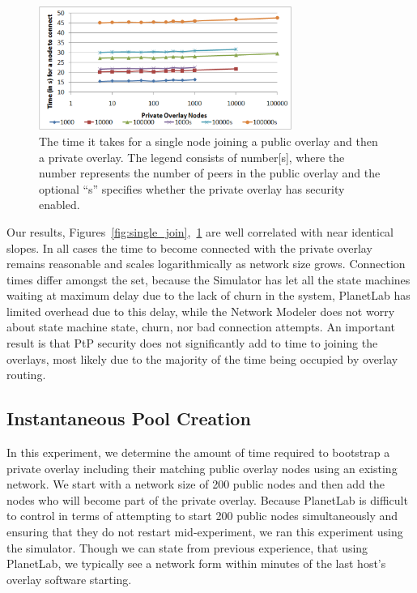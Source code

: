 \documentclass[conference]{IEEEtran}
\begin{document}
\begin{figure}[h]
\centering
\includegraphics[width=3.25in]{single_join_mod.eps}
\caption{The time it takes for a single node joining a public overlay and then
a private overlay. The legend consists of number[s], where the number
represents the number of peers in the public overlay and the optional ``s''
specifies whether the private overlay has security enabled.}
\label{fig:single_join_mod}
\end{figure}

Our results, Figures~\ref{fig:single_join},~\ref{fig:single_join_mod} are well
correlated with near identical slopes.  In all cases the time to become
connected with the private overlay remains reasonable and scales logarithmically
as network size grows.  Connection times differ amongst the set, because
the Simulator has let all the state machines waiting at maximum delay due to
the lack of churn in the system, PlanetLab has limited overhead due to this
delay, while the Network Modeler does not worry about state machine state,
churn, nor bad connection attempts.  An important result is that PtP security
does not significantly add to time to joining the overlays, most likely due
to the majority of the time being occupied by overlay routing.

\subsection{Instantaneous Pool Creation}
\label{mass_join}
In this experiment, we determine the amount of time required to bootstrap a
private overlay including their matching public overlay nodes using an existing
network.  We start with a network size of 200 public nodes and then add the
nodes who will become part of the private overlay.  Because PlanetLab is
difficult to control in terms of attempting to start 200 public nodes
simultaneously and ensuring that they do not restart mid-experiment, we ran
this experiment using the simulator.  Though we can state from previous
experience, that using PlanetLab, we typically see a network form within
minutes of the last host's overlay software starting.
\end{document}
